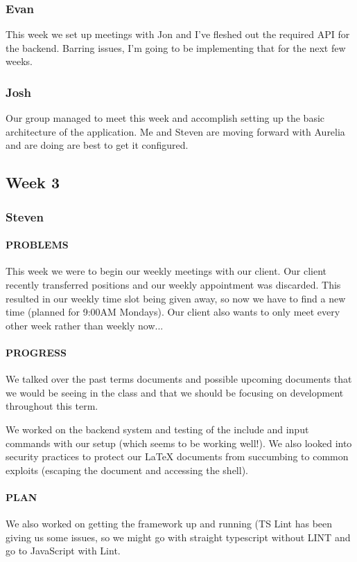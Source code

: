 \documentclass[onecolumn, draftclsnofoot,10pt, compsoc]{IEEEtran}
\begin{document}
	\subsubsection{Evan}
	
	This week we set up meetings with Jon and I've fleshed out the required API for the backend. Barring issues, I'm going to be implementing that for the next few weeks.
	
	\subsubsection{Josh}
	Our group managed to meet this week and accomplish setting up the basic architecture of the application. Me and Steven are moving forward with Aurelia and are doing are best to get it configured. 
\subsection{Week 3}
	\subsubsection{Steven}
	\paragraph{PROBLEMS}
	This week we were to begin our weekly meetings with our client. Our client recently transferred positions and our weekly appointment was discarded. This resulted in our weekly time slot being given away, so now we have to find a new time (planned for 9:00AM Mondays). Our client also wants to only meet every other week rather than weekly now...
	
	\paragraph{PROGRESS}
	We talked over the past terms documents and possible upcoming documents that we would be seeing in the class and that we should be focusing on development throughout this term.
	
	We worked on the backend system and testing of the include and input commands with our setup (which seems to be working well!). We also looked into security practices to protect our LaTeX documents from succumbing to common exploits (escaping the document and accessing the shell).
	
	\paragraph{PLAN}
	We also worked on getting the framework up and running (TS Lint has been giving us some issues, so we might go with straight typescript without LINT and go to JavaScript with Lint.
	
\end{document}
